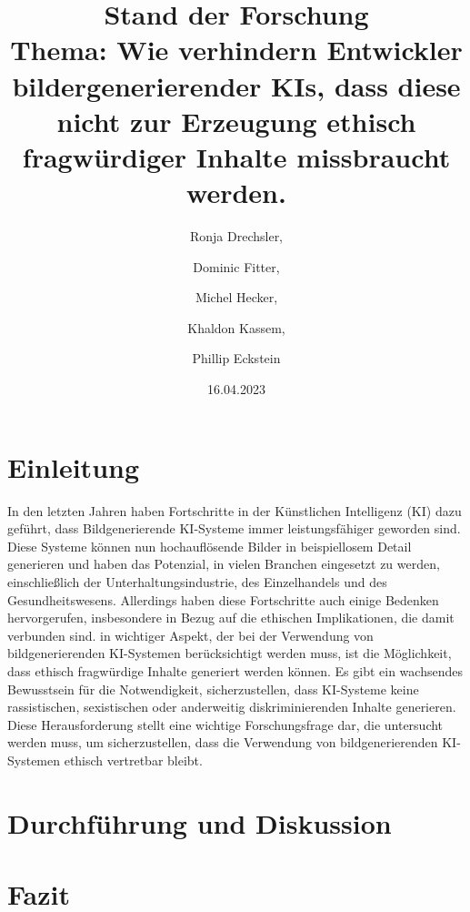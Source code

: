 \documentclass[12pt]{article}
\title{Stand der Forschung \\[1ex] \large Thema: Wie verhindern Entwickler bildergenerierender KIs, dass diese nicht zur Erzeugung ethisch fragwürdiger Inhalte missbraucht werden.}
\date{16.04.2023}
\author{Ronja Drechsler, \and Dominic Fitter, \and Michel Hecker, \and Khaldon Kassem, \and Phillip Eckstein}
\begin{document}
\maketitle
\tableofcontents
\section{Einleitung}
In den letzten Jahren haben Fortschritte in der Künstlichen Intelligenz (KI) dazu geführt, dass Bildgenerierende KI-Systeme immer 
leistungsfähiger geworden sind. Diese Systeme können nun hochauflösende Bilder in beispiellosem Detail generieren und haben das Potenzial,
 in vielen Branchen eingesetzt zu werden, einschließlich der Unterhaltungsindustrie, des Einzelhandels und des Gesundheitswesens. 
 Allerdings haben diese Fortschritte auch einige Bedenken hervorgerufen, insbesondere in Bezug auf die ethischen Implikationen, 
 die damit verbunden sind.
 in wichtiger Aspekt, der bei der Verwendung von bildgenerierenden KI-Systemen berücksichtigt werden muss, ist die Möglichkeit, dass ethisch fragwürdige Inhalte generiert werden können. Es gibt ein wachsendes Bewusstsein für die Notwendigkeit, sicherzustellen, dass KI-Systeme keine rassistischen, sexistischen oder anderweitig diskriminierenden Inhalte generieren. Diese Herausforderung stellt eine wichtige Forschungsfrage dar, die untersucht werden muss, um sicherzustellen, dass die Verwendung von bildgenerierenden KI-Systemen ethisch vertretbar bleibt.


\section{Durchführung und Diskussion}
\section{Fazit}


\end{document}

